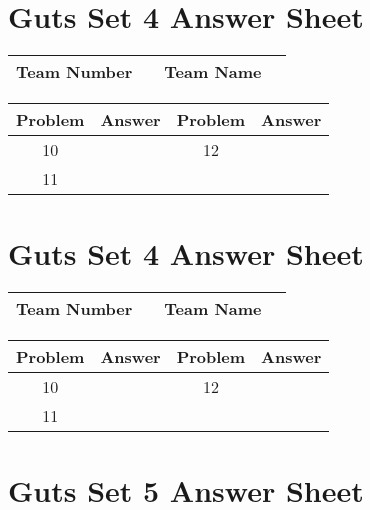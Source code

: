\documentclass[14pt]{article}
\begin{document}
\vspace{30px}

\section*{Guts Set 4 Answer Sheet}

\begin{center}
\begin{tabular}{|r|r|r|r|}
\hline
	Team Number & \hspace{10em} &
	Team Name & \hspace{15em} \\ \hline
\end{tabular}
\end{center}
\begin{tabularx}{\textwidth}{|c|l|c|X|}\hline
	Problem & Answer & Problem & Answer \\\hline
	10 & \hspace{15em} & 12 & \\\hline
	11 & & & \\\hline
\end{tabularx}

\vspace{30px}

\section*{Guts Set 4 Answer Sheet}

\begin{center}
\begin{tabular}{|r|r|r|r|}
\hline
	Team Number & \hspace{10em} &
	Team Name & \hspace{15em} \\ \hline
\end{tabular}
\end{center}
\begin{tabularx}{\textwidth}{|c|l|c|X|}\hline
	Problem & Answer & Problem & Answer \\\hline
	10 & \hspace{15em} & 12 & \\\hline
	11 & & & \\\hline
\end{tabularx}

\section*{Guts Set 5 Answer Sheet}
\end{document}
